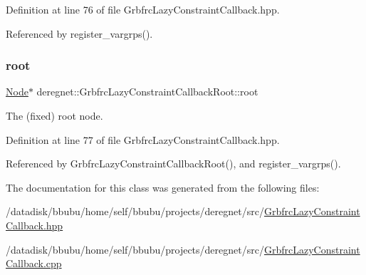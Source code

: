 Definition at line 76 of file Grbfrc\+Lazy\+Constraint\+Callback.\+hpp.



Referenced by register\+\_\+vargrps().

\mbox{\label{classderegnet_1_1GrbfrcLazyConstraintCallbackRoot_a49a59d875ea23a1b443ec39b3c221e4d}} 
\subsubsection{\texorpdfstring{root}{root}}
{\footnotesize\ttfamily \hyperlink{namespacederegnet_a744bad34f2de9856d36715a445f027f3}{Node}$\ast$ deregnet\+::\+Grbfrc\+Lazy\+Constraint\+Callback\+Root\+::root\hspace{0.3cm}{\ttfamily [private]}}



The (fixed) root node. 



Definition at line 77 of file Grbfrc\+Lazy\+Constraint\+Callback.\+hpp.



Referenced by Grbfrc\+Lazy\+Constraint\+Callback\+Root(), and register\+\_\+vargrps().



The documentation for this class was generated from the following files\+:\begin{DoxyCompactItemize}
\item 
/datadisk/bbubu/home/self/bbubu/projects/deregnet/src/\hyperlink{GrbfrcLazyConstraintCallback_8hpp}{Grbfrc\+Lazy\+Constraint\+Callback.\+hpp}\item 
/datadisk/bbubu/home/self/bbubu/projects/deregnet/src/\hyperlink{GrbfrcLazyConstraintCallback_8cpp}{Grbfrc\+Lazy\+Constraint\+Callback.\+cpp}\end{DoxyCompactItemize}
